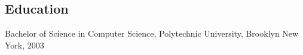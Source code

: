 \documentclass[margin]{res}
\begin{document}
\begin{resume}
\section{Education}
Bachelor of Science in Computer Science, Polytechnic University, Brooklyn New
York, 2003

\end{resume}
\end{document}

